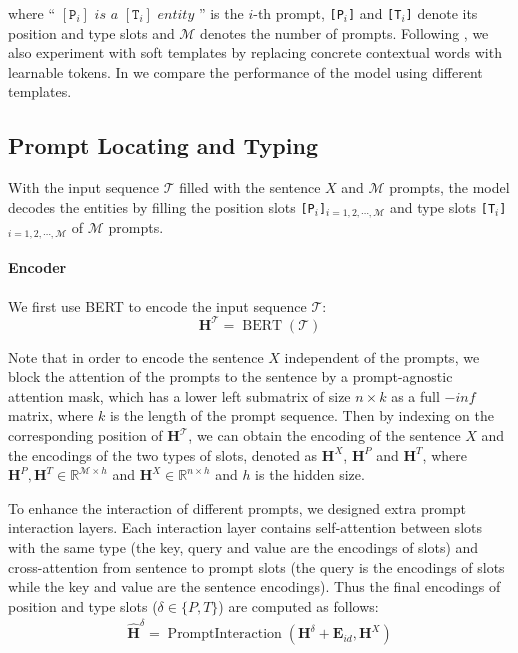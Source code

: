 \documentclass[11pt]{article}
\begin{document}
\noindent where `` $\left[\texttt{P}_{i}\right] \textit{ is a }\left[\texttt{T}_{i}\right] \textit{ entity }$'' is 
 the $i$-th prompt, \texttt{[P$_{i}$]} and \texttt{[T$_{i}$]} denote its position and type slots and $\mathcal{M}$ denotes the number of prompts. Following \citet{lester-etal-2021-power, gao-etal-2021-making}, we also experiment with soft templates by replacing concrete contextual words with learnable tokens. In  we compare the performance of the model using different templates.


\subsection{Prompt Locating and Typing}
\label{3.3}

With the input sequence $\mathcal{T}$ filled with the sentence $X$ and $\mathcal{M}$ prompts, the model decodes the entities by filling the position slots \texttt{[P$_{i}$]$_{i=1,2, \cdots, \mathcal{M}}$} and type slots \texttt{[T$_{i}$]$_{i=1,2, \cdots, \mathcal{M}}$} of $\mathcal{M}$ prompts.

\paragraph{Encoder}

We first use BERT \citep{devlin-etal-2019-bert} to encode the input sequence $\mathcal{T}$: 
\begin{equation*}
    \mathbf{H}^\mathcal{T} = \operatorname{BERT}\left(\mathcal{T}\right)
\end{equation*}

\noindent Note that in order to encode the sentence $X$ independent of the prompts, we block the attention of the prompts to the sentence by a prompt-agnostic attention mask, which has a lower left submatrix of size $n\times k$ as a full $-inf$ matrix, where $k$ is the length of the prompt sequence. Then by indexing on the corresponding position of $\mathbf{H}^\mathcal{T}$, we can obtain the encoding of the sentence $X$ and the encodings of the two types of slots, denoted as $\mathbf{H}^X$, $\mathbf{H}^P$ and $\mathbf{H}^T$, where $\mathbf{H}^P, \mathbf{H}^T\in \mathbb{R}^{\mathcal{M}\times h}$ and $\mathbf{H}^X\in \mathbb{R}^{n\times h}$ and $h$ is the hidden size.


To enhance the interaction of different prompts, we designed extra prompt interaction layers. Each interaction layer contains self-attention between slots with the same type (the key, query and value are the encodings of slots) and cross-attention from sentence to prompt slots (the query is the encodings of slots while the key and value are the sentence encodings). Thus the final encodings of position and type slots ($\delta\in\{P,T\}$) are computed as follows:
\begin{align*}
    \hat{\mathbf{H}}^\delta = \operatorname{PromptInteraction}\left(\mathbf{H}^\delta+\mathbf{E}_{id}, \mathbf{H}^X\right) 
\end{align*}
\end{document}
